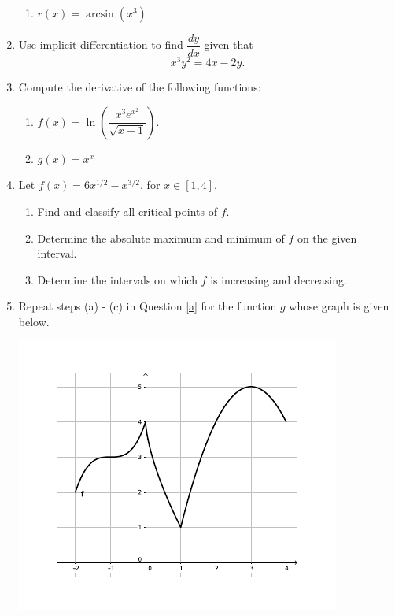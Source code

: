 \documentclass[12pt]{article}
\newcommand{\points}[1]{\marginpar{\hspace{24pt}[#1]}}
\newcommand{\di}{\displaystyle}
\begin{document}
\begin{enumerate}
\begin{enumerate}
 \item $\di r(x) = \arcsin(x^3)$ \points{2}
\end{enumerate}
\newpage

\item Use implicit differentiation to find $\dfrac{dy}{dx}$ given that \points{4}
\[
 x^3y^2 = 4x-2y.
\]

\vspace{3in}

\item Compute the derivative of the following functions:
\begin{enumerate}
 \item $f(x) = \ln\left(\dfrac{x^3e^{x^2}}{\sqrt{x+1}}\right)$. \points{3}

\vspace{2in}

 \item $g(x) = x^x$ \points{3}
\end{enumerate}
\newpage

\item Let $f(x) = 6x^{1/2}-x^{3/2}$, for $x\in [1,4]$.\label{a}
\begin{enumerate}
 \item Find and classify all critical points of $f$. \points{4}
 \item Determine the absolute maximum and minimum of $f$ on the given interval. \points{1}
 \item Determine the intervals on which $f$ is increasing and decreasing.\points{1}
\end{enumerate}
\vspace{4in}

\item Repeat steps (a) - (c) in Question \ref{a} for the function $g$ whose graph is given below. \points{4}
\begin{multicols}{2}
 \includegraphics[width=0.95\columnwidth]{FE-8}
\end{multicols}


\end{enumerate}
\end{document}
